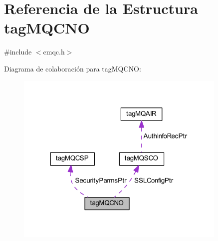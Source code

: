 \hypertarget{structtag_m_q_c_n_o}{}\section{Referencia de la Estructura tag\+M\+Q\+C\+N\+O}
\label{structtag_m_q_c_n_o}


{\ttfamily \#include $<$cmqc.\+h$>$}



Diagrama de colaboración para tag\+M\+Q\+C\+N\+O\+:\nopagebreak
\begin{figure}[H]
\begin{center}
\leavevmode
\includegraphics[width=286pt]{structtag_m_q_c_n_o__coll__graph}
\end{center}
\end{figure}
